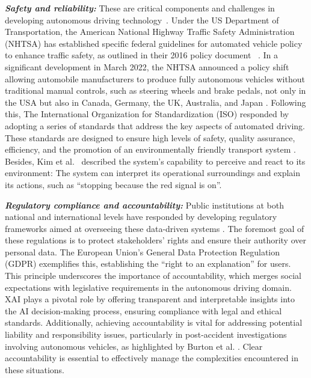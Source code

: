 \documentclass[final,5p,times,twocolumn]{elsarticle}
\begin{document}
\textbf{ \textit{Safety and reliability:}} These are critical components and challenges in developing autonomous driving technology~\cite{corso2020interpretable}. Under the US Department of Transportation, the American National Highway Traffic Safety Administration (NHTSA) has established specific federal guidelines for automated vehicle policy to enhance traffic safety, as outlined in their 2016 policy document 
~\cite{mcgehee2016review}. In a significant development in March 2022, the NHTSA announced a policy shift allowing automobile manufacturers to produce fully autonomous vehicles without traditional manual controls, such as steering wheels and brake pedals, not only in the USA but also in Canada, Germany, the UK, Australia, and Japan \cite{atakishiyev2021explainable}. Following this, The International Organization for Standardization (ISO) responded by adopting a series of standards that address the key aspects of automated driving. These standards are designed to ensure high levels of safety, quality assurance, efficiency, and the promotion of an environmentally friendly transport system \cite{rahman2022transportation}. Besides, Kim et al.~ \cite{kim2020advisable,kim2021toward} described the system's capability to perceive and react to its environment: The system can interpret its operational surroundings and explain its actions, such as ``stopping because the red signal is on''.


\textbf{ \textit{Regulatory compliance and accountability:}} %
Public institutions at both national and international levels have responded by developing regulatory frameworks aimed at overseeing these data-driven systems \cite{atakishiyev2021explainable}. The foremost goal of these regulations is to protect stakeholders' rights and ensure their authority over personal data. The European Union's General Data Protection Regulation (GDPR) \cite{regulation2016regulation} exemplifies this, establishing the ``right to an explanation'' for users. This principle underscores the importance of accountability, which merges social expectations with legislative requirements in the autonomous driving domain. XAI plays a pivotal role by offering transparent and interpretable insights into the AI decision-making process, ensuring compliance with legal and ethical standards. Additionally, achieving accountability is vital for addressing potential liability and responsibility issues, particularly in post-accident investigations involving autonomous vehicles, as highlighted by Burton et al. \cite{burton2020mind}. Clear accountability is essential to effectively manage the complexities encountered in these situations.
\end{document}
